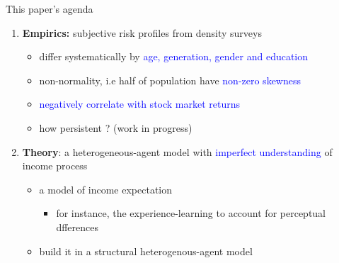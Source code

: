 \documentclass{beamer}
\begin{document}
\begin{frame}{This paper's agenda}
	\begin{enumerate}
		\item \textbf{Empirics:} subjective risk profiles from density surveys
		\begin{itemize}
			\item differ systematically by \textcolor{blue}{age, generation, gender and education}
			\item non-normality, i.e half of population have \textcolor{blue}{non-zero skewness}
			\item \textcolor{blue}{negatively correlate with stock market returns}
			 \item how persistent ? (work in progress)
		\end{itemize}
		\item \textbf{Theory}: a heterogeneous-agent  model with \textcolor{blue}{imperfect understanding} of income process
		\begin{itemize}
			\item a  model of income expectation
			\begin{itemize}
				\item for instance, the experience-learning to account for perceptual dfferences 
			\end{itemize}
			\item build it in a structural heterogenous-agent model 
		\end{itemize} 
\end{enumerate}
\end{frame}
\end{document}
